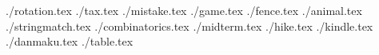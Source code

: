 \documentclass[11pt,letterpaper,oneside]{article}
\newcommand{\importproblem}[2]{{./#2.tex}}
\begin{document}
\raggedbottom

\importproblem{a}{rotation}
\importproblem{b}{tax}
\importproblem{c}{mistake}
\importproblem{d}{game}
\importproblem{e}{fence}
\importproblem{f}{animal}
\importproblem{g}{stringmatch}
\importproblem{h}{combinatorics}
\importproblem{i}{midterm}
\importproblem{j}{hike}
\importproblem{k}{kindle}
\importproblem{l}{danmaku}
\importproblem{m}{table}
\end{document}
